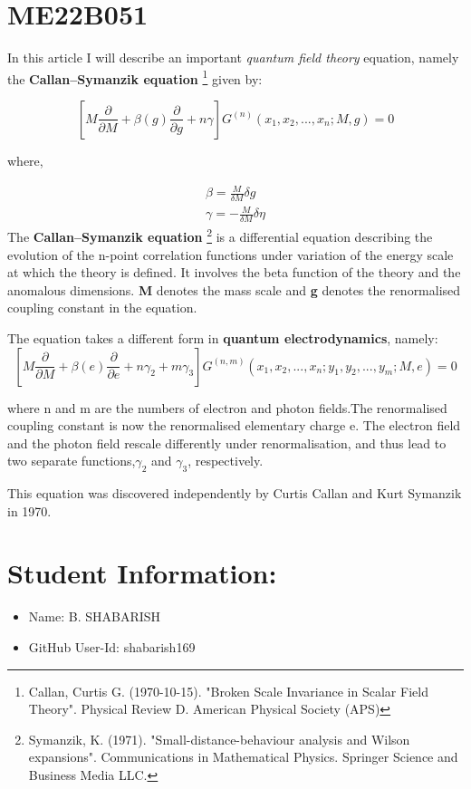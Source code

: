 \section*{ME22B051}
In this article I will describe an important \textit{quantum field theory} equation, namely the \textbf{Callan–Symanzik equation} \footnote[1]{Callan, Curtis G. (1970-10-15). "Broken Scale Invariance in Scalar Field Theory". Physical Review D. American Physical Society (APS)} given by:

\begin{equation}
\left[  M\frac{\partial }{\partial M} + \beta\left( g \right)\frac{\partial }{\partial g}+n\gamma  \right]G^{\left(n\right)} \left( x_{1},x_{2},...,x_{n};M,g\right)=0 
\end{equation}



where,

\begin{eqnarray}
\beta=\frac{M}{\delta M} \delta g 
\\ \gamma=-\frac{M}{\delta M} \delta \eta
\end{eqnarray}
The \textbf{Callan–Symanzik equation} \footnote[2]{Symanzik, K. (1971). "Small-distance-behaviour analysis and Wilson expansions". Communications in Mathematical Physics. Springer Science and Business Media LLC.} is a differential equation describing the evolution of the n-point correlation functions under variation of the energy scale at which the theory is defined. It involves the beta function of the theory and the anomalous dimensions. \textbf{M} denotes the mass scale and \textbf{g} denotes the renormalised coupling constant in the equation.

The equation takes a different form in \textbf{quantum electrodynamics}, namely:
\begin{equation}
\left[  M\frac{\partial }{\partial M} + \beta\left( e \right)\frac{\partial }{\partial e}+n\gamma_2+m\gamma_3  \right]G^{\left(n,m\right)} \left( x_{1},x_{2},...,x_{n};y_{1},y_{2},...,y_{m};M,e\right)=0 
\end{equation}

where n and m are the numbers of electron and photon fields.The renormalised coupling constant is now the renormalised elementary charge e. The electron field and the photon field rescale differently under renormalisation, and thus lead to two separate functions,$\gamma_{2}$ and $\gamma_{3}$, respectively.

This equation was discovered independently by Curtis Callan and Kurt Symanzik in 1970. 

\section*{Student Information:}
\begin{itemize}
    \item Name: B. SHABARISH 
    \item GitHub User-Id: shabarish169
\end{itemize}

